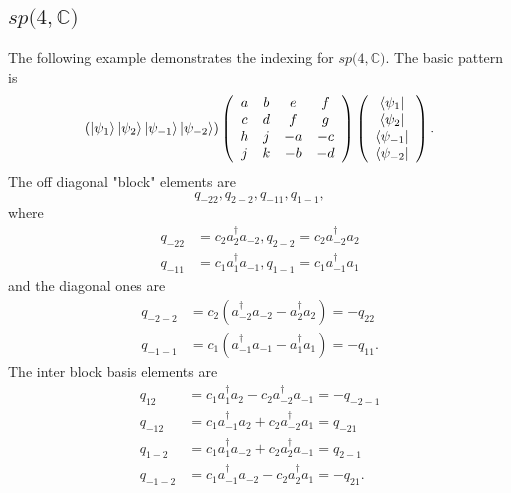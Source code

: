 \documentclass[aps,preprint]{revtex4}%
\begin{document}
\subsection{$sp(4,\mathbb{C)}$}

The following example demonstrates the indexing for $sp(4,\mathbb{C)}.$ The
basic pattern is%
\begin{equation}
\left(  \left\vert \psi_{1}\right\rangle \left\vert \psi_{2}\right\rangle
\left\vert \psi_{-1}\right\rangle \left\vert \psi_{-2}\right\rangle \right)
\left(
\begin{array}
[c]{cccc}%
a & b & e & f\\
c & d & f & g\\
h & j & -a & -c\\
j & k & -b & -d
\end{array}
\right)  \left(
\begin{array}
[c]{c}%
\left\langle \psi_{1}\right\vert \\
\left\langle \psi_{2}\right\vert \\
\left\langle \psi_{-1}\right\vert \\
\left\langle \psi_{-2}\right\vert
\end{array}
\right)  .
\end{equation}
The off diagonal "block" elements are
\begin{equation}
q_{-22},q_{2-2},q_{-11},q_{1-1},
\end{equation}
where
\begin{align}
q_{-22}  &  =c_{2}a_{2}^{\dagger}a_{-2},q_{2-2}=c_{2}a_{-2}^{\dagger}%
a_{2}\nonumber\\
q_{-11}  &  =c_{1}a_{1}^{\dagger}a_{-1},q_{1-1}=c_{1}a_{-1}^{\dagger}a_{1}%
\end{align}
and the diagonal ones are
\begin{align}
q_{-2-2}  &  =c_{2}\left(  a_{-2}^{\dagger}a_{-2}-a_{2}^{\dagger}a_{2}\right)
=-q_{22}\nonumber\\
q_{-1-1}  &  =c_{1}\left(  a_{-1}^{\dagger}a_{-1}-a_{1}^{\dagger}a_{1}\right)
=-q_{11}.
\end{align}
The inter block basis elements are
\begin{align}
q_{12}  &  =c_{1}a_{1}^{\dagger}a_{2}-c_{2}a_{-2}^{\dagger}a_{-1}%
=-q_{-2-1}\nonumber\\
q_{-12}  &  =c_{1}a_{-1}^{\dagger}a_{2}+c_{2}a_{-2}^{\dagger}a_{1}%
=q_{-21}\nonumber\\
q_{1-2}  &  =c_{1}a_{1}^{\dagger}a_{-2}+c_{2}a_{2}^{\dagger}a_{-1}%
=q_{2-1}\nonumber\\
q_{-1-2}  &  =c_{1}a_{-1}^{\dagger}a_{-2}-c_{2}a_{2}^{\dagger}a_{1}=-q_{21}.
\end{align}
\end{document}

